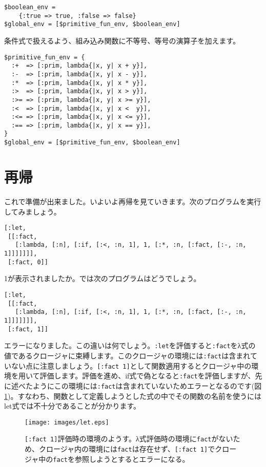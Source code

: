 \begin{lstlisting}
$boolean_env = 
    {:true => true, :false => false}
$global_env = [$primitive_fun_env, $boolean_env]
\end{lstlisting}

条件式で扱えるよう、組み込み関数に不等号、等号の演算子を加えます。

\begin{lstlisting}
$primitive_fun_env = {
  :+  => [:prim, lambda{|x, y| x + y}],
  :-  => [:prim, lambda{|x, y| x - y}],
  :*  => [:prim, lambda{|x, y| x * y}],
  :>  => [:prim, lambda{|x, y| x > y}],
  :>= => [:prim, lambda{|x, y| x >= y}],
  :<  => [:prim, lambda{|x, y| x <  y}],
  :<= => [:prim, lambda{|x, y| x <= y}],
  :== => [:prim, lambda{|x, y| x == y}],
}
$global_env = [$primitive_fun_env, $boolean_env]
\end{lstlisting}

\section{再帰}

これで準備が出来ました。いよいよ再帰を見ていきます。次のプログラムを実行してみましょう。

\begin{lstlisting}
[:let, 
 [[:fact,
   [:lambda, [:n], [:if, [:<, :n, 1], 1, [:*, :n, [:fact, [:-, :n, 1]]]]]]], 
 [:fact, 0]]
\end{lstlisting}

1が表示されましたか。では次のプログラムはどうでしょう。

\begin{lstlisting}
[:let, 
 [[:fact,
   [:lambda, [:n], [:if, [:<, :n, 1], 1, [:*, :n, [:fact, [:-, :n, 1]]]]]]], 
 [:fact, 1]]
\end{lstlisting}

エラーになりました。この違いは何でしょう。{\tt :let}を評価すると{\tt :fact}をλ式の値であるクロージャに束縛します。このクロージャの環境には{\tt :fact}は含まれていない点に注意しましょう。{\tt [:fact 1]}として関数適用するとクロージャ中の環境を用いて評価します。評価を進め、if式で偽となると{\tt :fact}を評価しますが、先に述べたようにこの環境には{\tt :fact}は含まれていないためエラーとなるのです(図\ref{fig:let})。すなわち、関数として定義しようとした式の中でその関数の名前を使うにはlet式では不十分であることが分かります。

\begin{figure}[htbp]
\begin{center}
\texttt{[image: images/let.eps]}
\end{center}
\caption{{\tt [:fact 1]}評価時の環境のようす。λ式評価時の環境に{\tt fact}がないため、クロージャ内の環境には{\tt fact}は存在せず、{\tt [:fact 1]}でクロージャ中の{\tt fact}を参照しようとするとエラーになる。}
\label{fig:let}
\end{figure}

